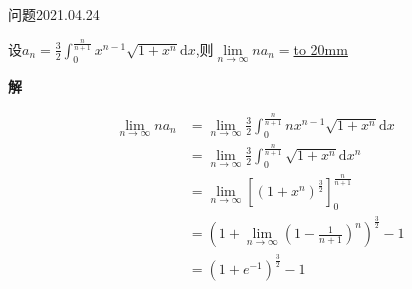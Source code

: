 \begin{mybox}{问题2021.04.24}
	
	\qquad 设$a_{n}=\frac{3}{2}\int_{0}^{\frac{n}{n+1}}x^{n-1}\sqrt{1+x^n}\mathrm{d}x$,则$\lim \limits_{n \to \infty}na_{n}=$\underline{\hbox to 20mm{}}
\end{mybox}
\noindent
\textbf{解}

\begin{align*}
	\lim \limits_{n\to \infty} na_{n}&=\lim \limits_{n\to \infty} \frac{3}{2}\int_{0}^{\frac{n}{n+1}}nx^{n-1}\sqrt{1+x^n}\mathrm{d}x\\
	&=\lim \limits_{n \to \infty} \frac{3}{2} \int_{0}^{\frac{n}{n+1}}\sqrt{1+x^n}\mathrm{d}x^n\\
	&=\lim \limits_{n \to \infty} [(1+x^n)^{\frac{3}{2}}]_{0}^{\frac{n}{n+1}}\\
	&=(1+\lim \limits_{n \to \infty}(1-\frac{1}{n+1})^n)^\frac{3}{2}-1\\
	&=(1+e^{-1})^{\frac{3}{2}}-1
\end{align*}